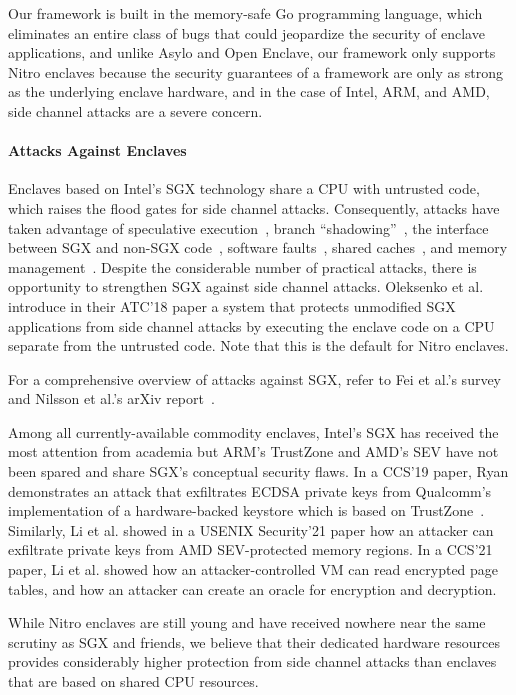Our framework is built in the memory-safe Go programming language, which
eliminates an entire class of bugs that could jeopardize the security of
enclave applications, and unlike Asylo and Open Enclave, our framework only
supports Nitro enclaves because the security guarantees of a framework are only
as strong as the underlying enclave hardware, and in the case of Intel, ARM,
and AMD, side channel attacks are a severe concern.

\paragraph{Attacks Against Enclaves}

Enclaves based on Intel's SGX technology share a CPU with untrusted code, which
raises the flood gates for side channel attacks.  Consequently, attacks have
taken advantage of
speculative execution~\cite{VanBulck2018a,VanSchaik2021a},
branch ``shadowing''~\cite{Lee2017b},
the interface between SGX and non-SGX code~\cite{Bulck19a},
software faults~\cite{Murdock2020a},
shared caches~\cite{Brasser2017a},
and memory management~\cite{Wang2017a}.
Despite the considerable number of practical attacks, there is opportunity to
strengthen SGX against side channel attacks.  Oleksenko et al. introduce in
their ATC'18 paper a system that protects unmodified SGX applications from side
channel attacks by executing the enclave code on a CPU separate from the
untrusted code.  Note that this is the default for Nitro enclaves.

For a comprehensive overview of attacks against SGX, refer to Fei et al.'s
survey~\cite{Fei2021a} and Nilsson et al.'s arXiv report~\cite{Nilsson20a}.

Among all currently-available commodity enclaves, Intel's SGX has received the
most attention from academia but ARM's TrustZone and AMD's SEV have not been
spared and share SGX's conceptual security flaws.  In a CCS'19 paper, Ryan
demonstrates an attack that exfiltrates ECDSA private keys from Qualcomm's
implementation of a hardware-backed keystore which is based on
TrustZone~\cite{Ryan2019a}.  Similarly, Li et al. showed in a USENIX
Security'21 paper how an attacker can exfiltrate private keys from AMD
SEV-protected memory regions.  In a CCS'21 paper, Li et al. showed how an
attacker-controlled VM can read encrypted page tables, and how an attacker can
create an oracle for encryption and decryption.

While Nitro enclaves are still young and have received nowhere near the same
scrutiny as SGX and friends, we believe that their dedicated hardware resources
provides considerably higher protection from side channel attacks than enclaves
that are based on shared CPU resources.
